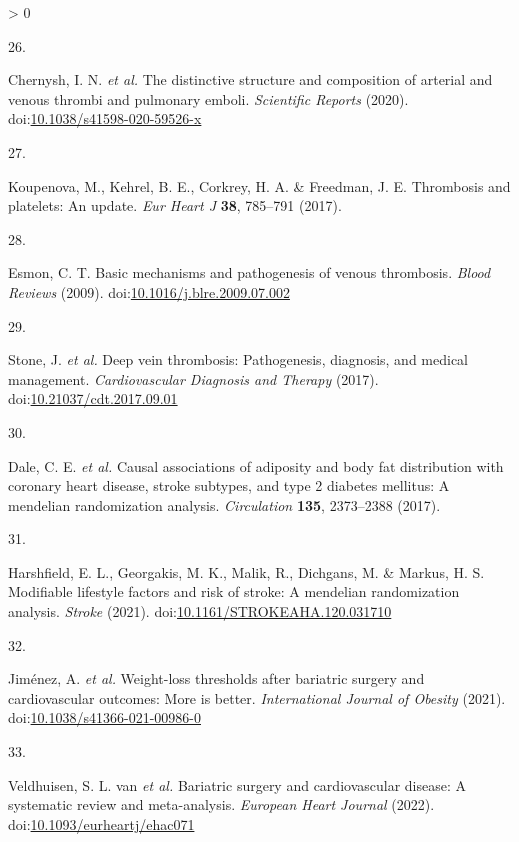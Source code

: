 \documentclass[11pt,twoside]{bristolthesis}
\newlength{\cslhangindent}
\newlength{\csllabelwidth}
\newenvironment{CSLReferences}[2] %
 {%
  \setlength{\parindent}{0pt}
  \ifodd #1 \everypar{\setlength{\hangindent}{\cslhangindent}}\ignorespaces\fi
  \ifnum #2 > 0
  \setlength{\parskip}{#2\baselineskip}
  \fi
 }%
 {}
\newcommand{\CSLLeftMargin}[1]{\parbox[t]{\csllabelwidth}{#1}}
\newcommand{\CSLRightInline}[1]{\parbox[t]{\linewidth - \csllabelwidth}{#1}\break}
\begin{document}
\begin{CSLReferences}{0}{0}
\leavevmode\hypertarget{ref-Chernysh2020}{}%
\CSLLeftMargin{26. }
\CSLRightInline{Chernysh, I. N. \emph{et al.} The distinctive structure and composition of arterial and venous thrombi and pulmonary emboli. \emph{Scientific Reports} (2020). doi:\href{https://doi.org/10.1038/s41598-020-59526-x}{10.1038/s41598-020-59526-x}}

\leavevmode\hypertarget{ref-Koupenova2017a}{}%
\CSLLeftMargin{27. }
\CSLRightInline{Koupenova, M., Kehrel, B. E., Corkrey, H. A. \& Freedman, J. E. Thrombosis and platelets: An update. \emph{Eur Heart J} \textbf{38}, 785--791 (2017).}

\leavevmode\hypertarget{ref-Esmon2009}{}%
\CSLLeftMargin{28. }
\CSLRightInline{Esmon, C. T. Basic mechanisms and pathogenesis of venous thrombosis. \emph{Blood Reviews} (2009). doi:\href{https://doi.org/10.1016/j.blre.2009.07.002}{10.1016/j.blre.2009.07.002}}

\leavevmode\hypertarget{ref-Stone2017}{}%
\CSLLeftMargin{29. }
\CSLRightInline{Stone, J. \emph{et al.} Deep vein thrombosis: Pathogenesis, diagnosis, and medical management. \emph{Cardiovascular Diagnosis and Therapy} (2017). doi:\href{https://doi.org/10.21037/cdt.2017.09.01}{10.21037/cdt.2017.09.01}}

\leavevmode\hypertarget{ref-Dale2017}{}%
\CSLLeftMargin{30. }
\CSLRightInline{Dale, C. E. \emph{et al.} Causal associations of adiposity and body fat distribution with coronary heart disease, stroke subtypes, and type 2 diabetes mellitus: A mendelian randomization analysis. \emph{Circulation} \textbf{135}, 2373--2388 (2017).}

\leavevmode\hypertarget{ref-Harshfield2021}{}%
\CSLLeftMargin{31. }
\CSLRightInline{Harshfield, E. L., Georgakis, M. K., Malik, R., Dichgans, M. \& Markus, H. S. Modifiable lifestyle factors and risk of stroke: A mendelian randomization analysis. \emph{Stroke} (2021). doi:\href{https://doi.org/10.1161/STROKEAHA.120.031710}{10.1161/STROKEAHA.120.031710}}

\leavevmode\hypertarget{ref-Jimenez2021}{}%
\CSLLeftMargin{32. }
\CSLRightInline{Jiménez, A. \emph{et al.} Weight-loss thresholds after bariatric surgery and cardiovascular outcomes: More is better. \emph{International Journal of Obesity} (2021). doi:\href{https://doi.org/10.1038/s41366-021-00986-0}{10.1038/s41366-021-00986-0}}

\leavevmode\hypertarget{ref-vanVeldhuisen2022}{}%
\CSLLeftMargin{33. }
\CSLRightInline{Veldhuisen, S. L. van \emph{et al.} Bariatric surgery and cardiovascular disease: A systematic review and meta-analysis. \emph{European Heart Journal} (2022). doi:\href{https://doi.org/10.1093/eurheartj/ehac071}{10.1093/eurheartj/ehac071}}


\end{CSLReferences}
\end{document}

